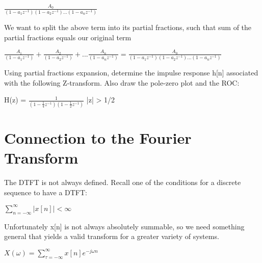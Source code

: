 \documentclass[11pt]{article}
\begin{document}
\begin{center}


$
\frac{A_0}{(1-a_1 z^{-1})(1 - a_2 z^{-1})  ... (1 - a_n z^{-1})}
$

\vspace{3mm}

\end{center}


We want to split the above term into its partial fractions, such that sum of the partial fractions equals our original term
\begin{center}
$
\frac{A_1}{(1-a_1 z^{-1})} + \frac{A_2}{(1 - a_2 z^{-1})} + ... \frac{A_n}{(1 - a_n z^{-1})} = \frac{A_0}{(1-a_1 z^{-1})(1 - a_2 z^{-1}) ... (1 - a_n z^{-1})}
$

\end{center}

\vspace{3mm}

Using partial fractions expansion, determine the impulse response h[n] associated with the following Z-transform. Also draw the pole-zero plot and the ROC:


\begin{center}

H(z) = $\frac{1}{(1-\frac{1}{4} z^{-1})(1-\frac{1}{2} z^{-1})}$   \hspace{3mm} |z| > 1/2

\end{center}

\section{Connection to the Fourier Transform}

The DTFT is not always defined. Recall one of the conditions for a discrete sequence to have a DTFT:\newline

\begin{center}

$
\sum_{n = -\infty}^{\infty} |x[n]| < \infty
$
\end{center}

\vspace{2mm}

Unfortunately x[n] is not always absolutely summable, so we need something general that yields a valid transform for a greater variety of systems.

\vspace{2mm}

\begin{center}

$
X(\omega) = \sum_{\tau  = -\infty}^{\infty} x[n] e^{-j \omega n}
$
\end{center}
\end{document}
